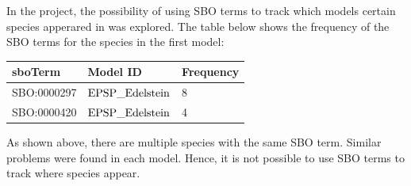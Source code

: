 \documentclass[portrait,a1paper,fontscale=0.5]{baposter}
\begin{document}
\begin{poster}
{In the project, the possibility of using SBO terms to track which models certain species apperared in was explored. The table below shows the frequency of the SBO terms for the species in the first model:
  \begin{flushleft}
    {\footnotesize{
    \begin{tabular}{ | p{1.7cm} | p{2.29cm} | p{1.2cm} | }
    \hline
    sboTerm & Model ID & Frequency \\ \hline
    SBO:0000297 & $\text{\textnormal{EPSP\_Edelstein}}$ & 8 \\ \hline
    SBO:0000420 & $\text{\textnormal{EPSP\_Edelstein}}$ & 4 \\
    \hline
    \end{tabular}}}
  \end{flushleft}
  As shown above, there are multiple species with the same SBO term. Similar problems were found in each model. Hence, it is not possible to use SBO terms to track where species appear.
}
 
\end{poster}
\end{document}
